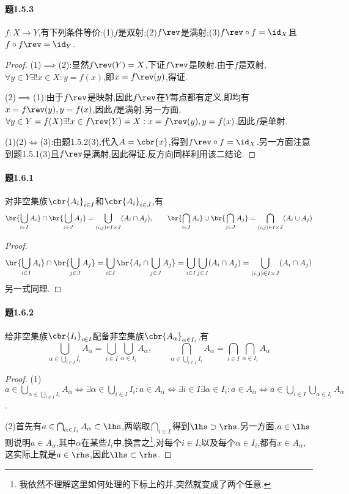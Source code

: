 \documentclass{article}
\begin{document}
\paragraph{题1.5.3}$f:X\to Y$,有下列条件等价:(1)$f$是双射;(2)$f\rev$是满射;(3)$f\rev\circ f=\id_X$且$f\circ f\rev=\id_Y$.
\begin{proof}
    (1)$\implies$(2):显然$f\rev(Y)=X$,下证$f\rev$是映射.由于$f$是双射,$\forall y\in Y\exists! x\in X:y=f(x)$,即$x=f\rev(y)$,得证.

    (2)$\implies$(1):由于$f\rev$是映射,因此$f\rev$在$Y$每点都有定义,即均有$x=f\rev(y),y=f(x)$,因此$f$是满射.另一方面,$\forall y\in Y=f(X)\exists!x\in f\rev(Y)=X:x=f\rev(y),y=f(x)$,因此$f$是单射.

    (1)(2)$\iff$(3):由题1.5.2(3),代入$A=\cbr{x}$,得到$f\rev\circ f=\id_X$.另一方面注意到题1.5.1(3)且$f\rev$是满射,因此得证.反方向同样利用该二结论.
\end{proof}

\paragraph{题1.6.1}对非空集族$\cbr{A_i}_{i\in I}$和$\cbr{A_i}_{i\in J}$,有
$$\br{\bigcup_{i\in I}A_i}\cap \br{\bigcup_{j\in J}A_j}=\bigcup_{(i,j)\in I\times J}(A_i\cap A_j),\qquad \br{\bigcap_{i\in I}A_i}\cup \br{\bigcap_{j\in J}A_j}=\bigcap_{(i,j)\in I\times J}(A_i\cup A_j)$$
\begin{proof}
    $$\br{\bigcup_{i\in I}A_i}\cap \br{\bigcup_{j\in J}A_j}=\bigcup_{i\in I}\br{A_i\cap \bigcup_{j\in J}A_j}=\bigcup_{i\in I}\bigcup_{j\in J}(A_i\cap A_j)=\bigcup_{(i,j)\in I\times J}(A_i\cap A_j)$$
    另一式同理.
\end{proof}

\paragraph{题1.6.2}给非空集族$\cbr{I_i}_{i\in I}$配备非空集族$\cbr{A_\alpha}_{\alpha\in I_i}$,有
$$\bigcup_{\alpha\in \bigcup_{i\in I}I_i}A_\alpha=\bigcup_{i\in I}\bigcup_{\alpha\in I_i}A_\alpha,\qquad \bigcap_{\alpha\in \bigcup_{i\in I}I_i}A_\alpha=\bigcap_{i\in I}\bigcap_{\alpha\in I_i}A_\alpha$$
\begin{proof}
    (1)$a\in \bigcup_{\alpha\in \bigcup_{i\in I}I_i}A_\alpha\iff \exists \alpha\in \bigcup_{i\in I}I_i:a\in A_\alpha\iff \exists i\in I\exists \alpha\in I_i:a\in A_\alpha\iff a\in \bigcup_{i\in I}\bigcup_{\alpha\in I_i}A_\alpha$.

    (2)首先有$a\in \bigcap_{\alpha\in I_i}A_\alpha\subset \lhs$,两端取$\bigcap_{i\in I}$得到$\lhs\supset \rhs$.另一方面,$a\in \lhs$则说明$a\in A_\alpha$,其中$\alpha$在某些$I_i$中.换言之\footnote{我依然不理解这里如何处理的下标上的并,突然就变成了两个任意.},对每个$i\in I$,以及每个$\alpha\in I_i$,都有$x\in A_\alpha$,这实际上就是$a\in \rhs$,因此$\lhs\subset \rhs$.
\end{proof}
\end{document}
